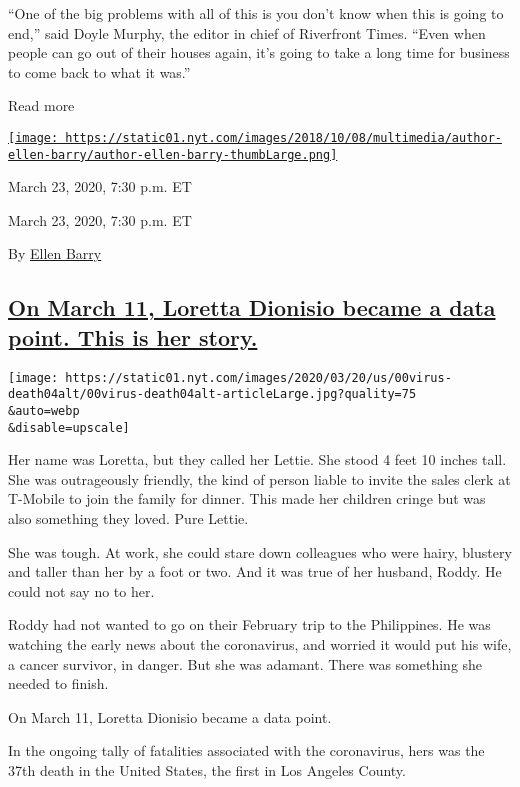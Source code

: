 ``One of the big problems with all of this is you don't know when this
is going to end,'' said Doyle Murphy, the editor in chief of Riverfront
Times. ``Even when people can go out of their houses again, it's going
to take a long time for business to come back to what it was.''

Read more

\href{https://www.nytimes.com/by/ellen-barry}{\texttt{[image: https://static01.nyt.com/images/2018/10/08/multimedia/author-ellen-barry/author-ellen-barry-thumbLarge.png]}}

March 23, 2020, 7:30 p.m. ET

March 23, 2020, 7:30 p.m. ET

By \href{https://www.nytimes.com/by/ellen-barry}{Ellen Barry}

\hypertarget{on-march-11-loretta-dionisio-became-a-data-point-this-is-her-story}{%
\subsection{\texorpdfstring{\protect\hyperlink{on-march-11-loretta-dionisio-became-a-data-point-this-is-her-story}{On
March 11, Loretta Dionisio became a data point. This is her
story.}}{On March 11, Loretta Dionisio became a data point. This is her story.}}\label{on-march-11-loretta-dionisio-became-a-data-point-this-is-her-story}}

\texttt{[image: https://static01.nyt.com/images/2020/03/20/us/00virus-death04alt/00virus-death04alt-articleLarge.jpg?quality=75\\\&auto=webp\\\&disable=upscale]}

Her name was Loretta, but they called her Lettie. She stood 4 feet 10
inches tall. She was outrageously friendly, the kind of person liable to
invite the sales clerk at T-Mobile to join the family for dinner. This
made her children cringe but was also something they loved. Pure Lettie.

She was tough. At work, she could stare down colleagues who were hairy,
blustery and taller than her by a foot or two. And it was true of her
husband, Roddy. He could not say no to her.

Roddy had not wanted to go on their February trip to the Philippines. He
was watching the early news about the coronavirus, and worried it would
put his wife, a cancer survivor, in danger. But she was adamant. There
was something she needed to finish.

On March 11, Loretta Dionisio became a data point.

In the ongoing tally of fatalities associated with the coronavirus, hers
was the 37th death in the United States, the first in Los Angeles
County.

